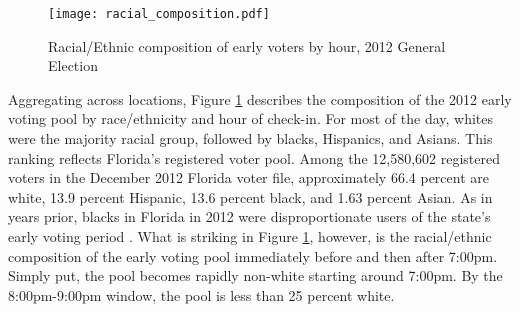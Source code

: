 \documentclass[12pt,titlepage]{article}
\begin{document}
\begin{figure}[!ht]
\caption{Racial/Ethnic composition of early voters by hour, 2012 General Election}
  \label{fig:race2012}
  \centering
    \centering\texttt{[image: racial\_composition.pdf]}
\end{figure}

Aggregating across locations, Figure \ref{fig:race2012} describes the
composition of the 2012 early voting pool by race/ethnicity and hour
of check-in.  For most of the day, whites were the majority racial
group, followed by blacks, Hispanics, and Asians.  This ranking
reflects Florida's registered voter pool.  Among the 12,580,602
registered voters in the December 2012 Florida voter file,
approximately 66.4 percent are white, 13.9 percent Hispanic, 13.6
percent black, and 1.63 percent Asian.  As in years prior, blacks in
Florida in 2012 were disproportionate users of the state's early
voting period \citep{herronsmith:souls}.  What is striking in Figure
\ref{fig:race2012}, however, is the racial/ethnic composition of the
early voting pool immediately before and then after 7:00pm.  Simply
put, the pool becomes rapidly non-white starting around 7:00pm.  By
the 8:00pm-9:00pm window, the pool is less than 25 percent white.




\end{document}
